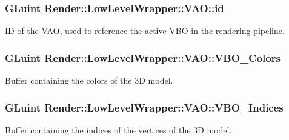 \subsubsection[{\texorpdfstring{id}{id}}]{\setlength{\rightskip}{0pt plus 5cm}G\+Luint Render\+::\+Low\+Level\+Wrapper\+::\+V\+A\+O\+::id}\hypertarget{struct_render_1_1_low_level_wrapper_1_1_v_a_o_a74e69d0a6b9572bcd41e1d9119c97c3a}{}\label{struct_render_1_1_low_level_wrapper_1_1_v_a_o_a74e69d0a6b9572bcd41e1d9119c97c3a}


ID of the \hyperlink{struct_render_1_1_low_level_wrapper_1_1_v_a_o}{V\+AO}, used to reference the active V\+BO in the rendering pipeline. 

\subsubsection[{\texorpdfstring{V\+B\+O\+\_\+\+Colors}{VBO_Colors}}]{\setlength{\rightskip}{0pt plus 5cm}G\+Luint Render\+::\+Low\+Level\+Wrapper\+::\+V\+A\+O\+::\+V\+B\+O\+\_\+\+Colors}\hypertarget{struct_render_1_1_low_level_wrapper_1_1_v_a_o_a207a0039f53847d17f612ea758ab94f8}{}\label{struct_render_1_1_low_level_wrapper_1_1_v_a_o_a207a0039f53847d17f612ea758ab94f8}


Buffer containing the colors of the 3D model. 

\subsubsection[{\texorpdfstring{V\+B\+O\+\_\+\+Indices}{VBO_Indices}}]{\setlength{\rightskip}{0pt plus 5cm}G\+Luint Render\+::\+Low\+Level\+Wrapper\+::\+V\+A\+O\+::\+V\+B\+O\+\_\+\+Indices}\hypertarget{struct_render_1_1_low_level_wrapper_1_1_v_a_o_a2749bf2659a5d8ddd844e75d63c54998}{}\label{struct_render_1_1_low_level_wrapper_1_1_v_a_o_a2749bf2659a5d8ddd844e75d63c54998}


Buffer containing the indices of the vertices of the 3D model. 

